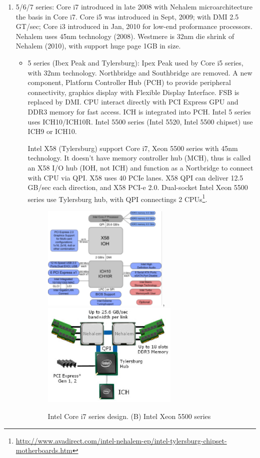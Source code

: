 \begin{enumerate}
  \item 5/6/7 series: Core i7 introduced in late 2008 with Nehalem
  microarchitecture the basis in Core i7. Core i5 was  introduced in Sept,
  2009; with DMI 2.5 GT/sec; Core i3 introduced in Jan, 2010 for low-end
  proformance processors. Nehalem uses 45nm technology (2008). Westmere is 32nm
  die shrink of Nehalem (2010), with support huge page 1GB in size.
  
  \begin{itemize}
    \item 5 series (Ibex Peak and Tylersburg): Ipex Peak used by Core i5 series,
    with 32nm technology. Northbridge and Southbridge are removed. A new
    component, Platform Controller Hub (PCH) to  provide peripheral 
    connectivity, graphics display with Flexible Display Interface. FSB is
    replaced by DMI. CPU interact directly with PCI Express GPU and DDR3 memory
    for fast access. ICH is integrated into PCH. Intel 5 series uses ICH10/ICH10R.
  Intel 5500 series (Intel 5520, Intel 5500  chipset) use ICH9 or ICH10. 
  
  Intel X58 (Tylersburg) support Core i7, Xeon 5500 series with 45nm technology.
  It doesn't have memory controller hub (MCH), thus is called an X58 I/O hub (IOH, not ICH) and
  function as a Nortbridge to connect with CPU via QPI. X58 uses 40 PCIe lanes.
  X58 QPI can deliver 12.5 GB/sec each direction, and X58 PCI-e 2.0. Dual-socket
  Intel Xeon 5500 series use Tylersburg hub, with QPI connectings 2
  CPUs\footnote{\url{http://www.avadirect.com/intel-nehalem-ep/intel-tylersburg-chipset-motherboards.htm}}.

\begin{figure}[hbt]
  \centerline{\includegraphics[height=5cm,
    angle=0]{./images/Intel_X58.eps}, \includegraphics[height=5cm,
    angle=0]{./images/Intel_Xeon_5500.eps}}
\caption{Intel Core i7 series design. (B) Intel Xeon 5500 series}
\label{fig:Intel_X58}
\end{figure}
  

\end{itemize}
\end{enumerate}
